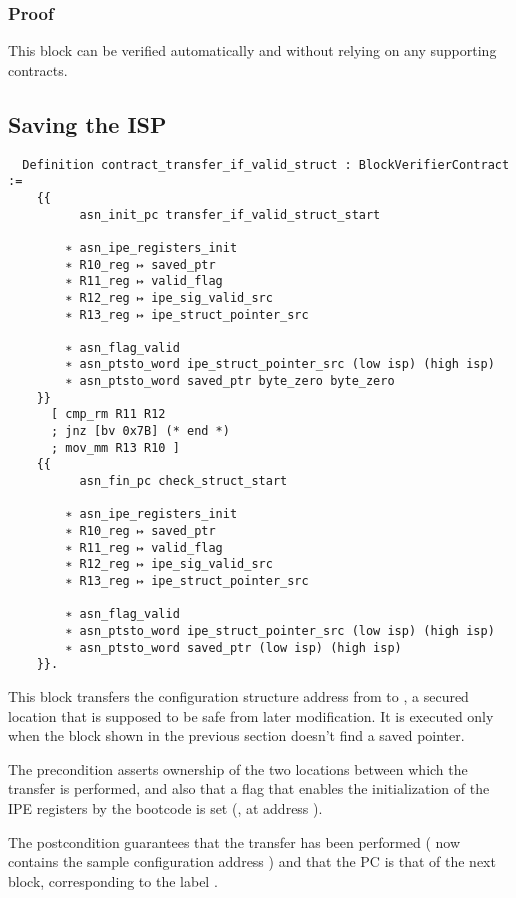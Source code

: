 \subsubsection{Proof}

This block can be verified automatically and without relying on any supporting contracts.

\subsection{Saving the ISP}

\begin{verbatim}
  Definition contract_transfer_if_valid_struct : BlockVerifierContract :=
    {{
          asn_init_pc transfer_if_valid_struct_start

        ∗ asn_ipe_registers_init
        ∗ R10_reg ↦ saved_ptr
        ∗ R11_reg ↦ valid_flag
        ∗ R12_reg ↦ ipe_sig_valid_src
        ∗ R13_reg ↦ ipe_struct_pointer_src

        ∗ asn_flag_valid
        ∗ asn_ptsto_word ipe_struct_pointer_src (low isp) (high isp)
        ∗ asn_ptsto_word saved_ptr byte_zero byte_zero
    }}
      [ cmp_rm R11 R12
      ; jnz [bv 0x7B] (* end *)
      ; mov_mm R13 R10 ]
    {{
          asn_fin_pc check_struct_start

        ∗ asn_ipe_registers_init
        ∗ R10_reg ↦ saved_ptr
        ∗ R11_reg ↦ valid_flag
        ∗ R12_reg ↦ ipe_sig_valid_src
        ∗ R13_reg ↦ ipe_struct_pointer_src

        ∗ asn_flag_valid
        ∗ asn_ptsto_word ipe_struct_pointer_src (low isp) (high isp)
        ∗ asn_ptsto_word saved_ptr (low isp) (high isp)
    }}.
\end{verbatim}

This block transfers the configuration structure address from  to , \ie a secured location that is supposed to be safe from later modification. It is executed only when the block shown in the previous section doesn't find a saved pointer.

The precondition asserts ownership of the two locations between which the transfer is performed, and also that a flag that enables the initialization of the IPE registers by the bootcode is set (, \ie {} at address ).

The postcondition guarantees that the transfer has been performed ( now contains the sample configuration address ) and that the PC is that of the next block, corresponding to the label .

